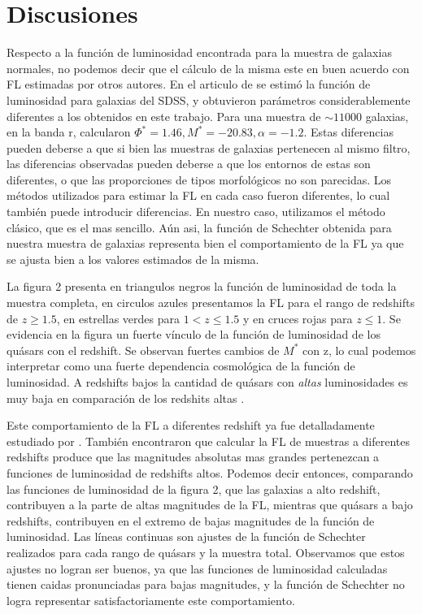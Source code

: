 \documentclass[a4paper,10pt]{article}
\begin{document}
\section{Discusiones}
Respecto a la funci\'on de luminosidad encontrada para la muestra de galaxias normales, no podemos decir que el c\'alculo de la misma este en buen acuerdo con FL estimadas por otros autores. En el articulo de \citet{Blanton2001} se estim\'o la funci\'on de luminosidad para galaxias del SDSS, y obtuvieron par\'ametros considerablemente diferentes a los obtenidos en este trabajo. Para una muestra de $\sim 11000$ galaxias, en la banda r, calcularon $\Phi^{\ast}=1.46,M^{\ast}=-20.83,\alpha=-1.2$. Estas diferencias pueden deberse a que si bien las muestras de galaxias pertenecen al mismo filtro, las diferencias observadas pueden deberse a que los entornos de estas son diferentes, o que las proporciones de tipos morfol\'ogicos no son parecidas. Los m\'etodos utilizados para estimar la FL en cada caso fueron diferentes, lo cual tambi\'en puede introducir diferencias. En nuestro caso, utilizamos el m\'etodo cl\'asico, que es el mas sencillo. A\'un asi, la funci\'on de Schechter obtenida para nuestra muestra de galaxias representa bien el comportamiento de la FL ya que se ajusta bien a los valores estimados de la misma. 


La figura 2 presenta en triangulos negros la funci\'on de luminosidad de toda la muestra completa, en circulos azules presentamos la FL para el rango de redshifts de $z\geq1.5$, en  estrellas verdes para $1<z\leq1.5$ y en cruces rojas para $z\leq1$. 
Se evidencia en la figura un fuerte v\'inculo  de la funci\'on de luminosidad de los qu\'asars con el redshift. Se observan fuertes cambios de $M^{\ast}$ con z, lo cual podemos interpretar como una fuerte dependencia cosmol\'ogica de la funci\'on de luminosidad. A redshifts bajos la cantidad de qu\'asars con \textit{altas} luminosidades es muy baja en comparaci\'on de los redshits altas \citep{Schneider}.

Este comportamiento de la FL a diferentes redshift ya fue detalladamente estudiado por \cite{Croom2009}. Tambi\'en encontraron que calcular la FL de muestras a diferentes redshifts produce que las magnitudes absolutas mas grandes pertenezcan a funciones de luminosidad de redshifts altos. Podemos decir entonces, comparando las funciones de luminosidad de la figura 2, que las galaxias a alto redshift, contribuyen a la parte de altas magnitudes de la FL, mientras que qu\'asars a bajo redshifts, contribuyen en el extremo de bajas magnitudes de la funci\'on de luminosidad. 
Las l\'ineas continuas son ajustes de la funci\'on de Schechter realizados para cada rango de qu\'asars y la muestra total. Observamos que estos ajustes no logran ser buenos, ya que las funciones de luminosidad calculadas tienen caidas pronunciadas para bajas magnitudes, y la funci\'on de Schechter no logra representar satisfactoriamente este comportamiento. 
\end{document}
